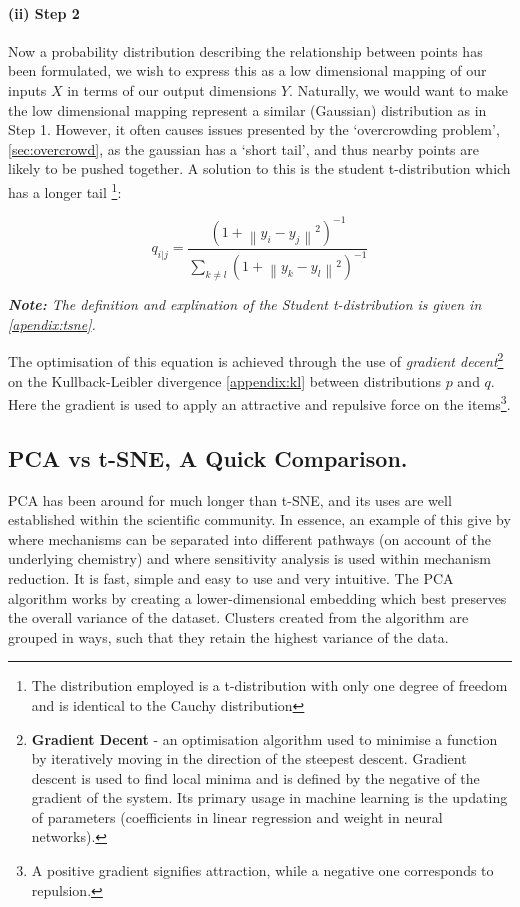 \paragraph{(ii) Step 2}
Now a probability distribution describing the relationship between points has been formulated, we wish to express this as a low dimensional mapping of our inputs $X$ in terms of our output dimensions $Y$. Naturally, we would want to make the low dimensional mapping represent a similar (Gaussian) distribution as in Step 1. However, it often causes issues presented by the `overcrowding problem', \autoref{sec:overcrowd}, as the gaussian has a `short tail', and thus nearby points are likely to be pushed together. A solution to this is the student t-distribution which has a longer tail \footnote{The distribution employed is a t-distribution with only one degree of freedom and is identical to the Cauchy distribution}:

\begin{equation}
q_{i|j} =\frac{(1 + \left \| y_i - y_j \right \|^2 )^{-1}}{\sum_{k \neq l} (1 + \left \| y_k - y_l \right \|^2 )^{-1} }
\end{equation}

\emph{\textbf{Note:} The definition and explination of the Student t-distribution is given in \autoref{apendix:tsne}.
}

The optimisation of this equation is achieved through the use of \emph{gradient decent}\footnote{\textbf{Gradient Decent} - an optimisation algorithm used to minimise a function by iteratively moving in the direction of the steepest descent. Gradient descent is used to find local minima and is defined by the negative of the gradient of the system. Its primary usage in machine learning is the updating of parameters (coefficients in linear regression and weight in neural networks).}
 on the Kullback-Leibler divergence \autoref{appendix:kl} between distributions $p$ and $q$. Here the gradient is used to apply an attractive and repulsive force on the items\footnote{A positive gradient signifies attraction, while a negative one corresponds to repulsion.}.




\subsection{PCA vs t-SNE, A Quick Comparison.}

PCA has been around for much longer than t-SNE, and its uses are well established within the scientific community. In essence, an example of this give by \cite{wyche} where mechanisms can be separated into different pathways (on account of the underlying chemistry) and \cite{kinetics} where sensitivity analysis is used within mechanism reduction. It is fast, simple and easy to use and very intuitive. The PCA algorithm works by creating a lower-dimensional embedding which best preserves the overall variance of the dataset. Clusters created from the algorithm are grouped in ways, such that they retain the highest variance of the data.

